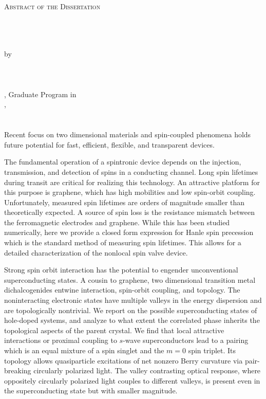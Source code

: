 \clearpage
\centering
\vspace*{-\toptafiddle}

\textsc{Abstract of the Dissertation} \\~\\

\SingleSpacing{}

\thetitle{} \\~\\
by \\~\\
\theauthor{} \\~\\

\thedegree, Graduate Program in \thefield{} \\
\theuniversity{}, \thedate{} \\
\thechair{} \\~\\

\justify{}
\DoubleSpacing{}
Recent focus on two dimensional materials and spin-coupled phenomena
holds future potential for fast, efficient, flexible, and transparent devices.

The fundamental operation of a spintronic device
depends on the injection, transmission, and detection
of spins in a conducting channel.
Long spin lifetimes during transit are critical for realizing this technology.
An attractive platform for this purpose is graphene, which has high mobilities
and low spin-orbit coupling.
Unfortunately, measured spin lifetimes are orders of magnitude smaller
than theoretically expected.
A source of spin loss is the resistance mismatch between
the ferromagnetic electrodes and graphene.
While this has been studied numerically,
here we provide a closed form expression for Hanle spin precession
which is the standard method of measuring spin lifetimes.
This allows for a detailed characterization of the nonlocal spin valve device.

Strong spin orbit interaction has the potential
to engender unconventional superconducting states.
A cousin to graphene, two dimensional transition metal dichalcogenides
entwine interaction, spin-orbit coupling, and topology.
The noninteracting electronic states have
multiple valleys in the energy dispersion
and are topologically nontrivial.
We report on the possible superconducting states
of hole-doped systems, and analyze to what extent the correlated phase
inherits the topological aspects of the parent crystal.
We find that local attractive interactions or proximal coupling to
$s$-wave superconductors lead to a pairing
which is an equal mixture of a spin singlet and the $m = 0$ spin triplet.
Its topology allows quasiparticle excitations
of net nonzero Berry curvature via pair-breaking circularly polarized light.
The valley contrasting optical response,
where oppositely circularly polarized light couples to different valleys,
is present even in the superconducting state but with smaller magnitude.

\enlargethispage{\bottafiddle}
\clearpage
